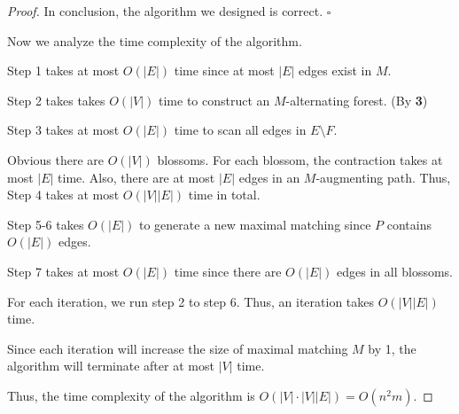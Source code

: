 \documentclass{article}
\newcommand{\whiteqed}{\hfill $\square$\par}
\begin{document}
\begin{proof}
    \vspace{1em} \hspace{1.3em}
    In conclusion, the algorithm we designed is correct. \whiteqed
    
    \vspace{2em} \hspace{1.3em}
    Now we analyze the time complexity of the algorithm.
    
    \hspace{1.3em}
    Step 1 takes at most $O(|E|)$ time since at most $|E|$ edges exist in $M$.
    
    \hspace{1.3em}
    Step 2 takes takes $O(|V|)$ time to construct an $M$-alternating forest. (By \textbf{3})
    
    \hspace{1.3em}
    Step 3 takes at most $O(|E|)$ time to scan all edges in $E\setminus F$.
    
    \hspace{1.3em}
    Obvious there are $O(|V|)$ blossoms. For each blossom, the contraction takes at most $|E|$ time. Also, there are at most $|E|$ edges in an $M$-augmenting path. Thus, Step 4 takes at most $O(|V||E|)$ time in total.
    
    \hspace{1.3em}
    Step 5-6 takes $O(|E|)$ to generate a new maximal matching since $P$ contains $O(|E|)$ edges.
    
    \hspace{1.3em}
    Step 7 takes at most $O(|E|)$ time since there are $O(|E|)$ edges in all blossoms.
    
    \hspace{1.3em}
    For each iteration, we run step 2 to step 6. Thus, an iteration takes $O(|V||E|)$ time.
    
    \hspace{1.3em}
    Since each iteration will increase the size of maximal matching $M$ by 1, the algorithm will terminate after at most $|V|$ time. 
    
    \hspace{1.3em}
    Thus, the time complexity of the algorithm is $O(|V|\cdot|V||E|)=O(n^2m)$.
\end{proof}
\end{document}
